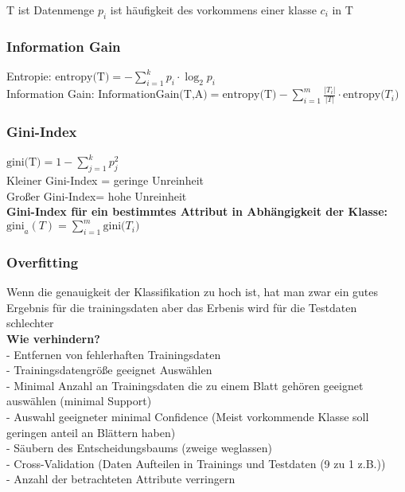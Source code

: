 \documentclass[a4paper]{scrartcl}
\begin{document}
T ist Datenmenge $p_i$ ist häufigkeit des vorkommens einer klasse $c_i$ in T\\
\subsubsection{Information Gain}
Entropie: $\text{entropy(T)} = - \sum\limits^k_{i=1}p_i\cdot\log_2p_i$\\


Information Gain: $\text{InformationGain(T,A)}=\text{entropy(T)}-\sum\limits^m_{i=1}\frac{|T_i|}{|T|}\cdot \text{entropy($T_i$)}$\\

\subsubsection{Gini-Index}
$\text{gini(T)}=1-\sum\limits^k_{j=1}p^2_j$\\

Kleiner Gini-Index = geringe Unreinheit\\
Großer Gini-Index= hohe Unreinheit\\

\textbf{Gini-Index für ein bestimmtes Attribut in Abhängigkeit der Klasse:}\\
$\text{gini}_a(T)=\sum\limits^m_{i=1}\text{gini($T_i$)}$\\

\subsubsection{Overfitting}
Wenn die genauigkeit der Klassifikation zu hoch ist, hat man zwar ein gutes Ergebnis für die trainingsdaten aber das Erbenis wird für die Testdaten schlechter\\

\textbf{Wie verhindern?}\\
- Entfernen von fehlerhaften Trainingsdaten\\
- Trainingsdatengröße geeignet Auswählen\\
- Minimal Anzahl an Trainingsdaten die zu einem Blatt gehören geeignet auswählen (minimal Support)\\
- Auswahl geeigneter minimal Confidence (Meist vorkommende Klasse soll geringen anteil an Blättern haben)\\
- Säubern des Entscheidungsbaums (zweige weglassen)\\
- Cross-Validation (Daten Aufteilen in Trainings und Testdaten (9 zu 1 z.B.))\\
- Anzahl der betrachteten Attribute verringern\\
\end{document}
